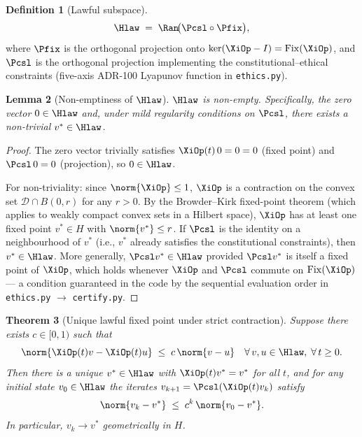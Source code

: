 \documentclass[12pt,a4paper]{article}
\theoremstyle{plain}
\newtheorem{theorem}{Theorem}[section]
\newtheorem{lemma}[theorem]{Lemma}
\theoremstyle{definition}
\newtheorem{definition}[theorem]{Definition}
\begin{document}
\begin{definition}[Lawful subspace]
  \label{def:hlaw}
  \[
    \Hlaw \;=\; \Ran\!\bigl(\Pcsl \circ \Pfix\bigr),
  \]
  where $\Pfix$ is the orthogonal projection onto
  $\ker(\XiOp - I) = \mathrm{Fix}(\XiOp)$, and $\Pcsl$ is the orthogonal
  projection implementing the constitutional--ethical constraints
  (five-axis ADR-100 Lyapunov function in \texttt{ethics.py}).
\end{definition}

\begin{lemma}[Non-emptiness of $\Hlaw$]
  \label{lem:nonempty}
  $\Hlaw$ is non-empty.  Specifically, the zero vector
  $0\in\Hlaw$ and, under mild regularity conditions on $\Pcsl$, there
  exists a non-trivial $v^*\in\Hlaw$.
\end{lemma}

\begin{proof}
  The zero vector trivially satisfies $\XiOp(t)\,0 = 0 = 0$ (fixed point) and
  $\Pcsl\,0 = 0$ (projection), so $0\in\Hlaw$.

  For non-triviality: since $\norm{\XiOp}\le 1$, $\XiOp$ is a contraction
  on the convex set $\mathcal{D}\cap B(0,r)$ for any $r>0$.  By the
  Browder--Kirk fixed-point theorem (which applies to weakly compact convex
  sets in a Hilbert space), $\XiOp$ has at least one fixed point
  $v^*\in H$ with $\norm{v^*}\le r$.  If $\Pcsl$ is the identity on a
  neighbourhood of $v^*$ (i.e., $v^*$ already satisfies the constitutional
  constraints), then $v^*\in\Hlaw$.  More generally, $\Pcsl v^*\in\Hlaw$
  provided $\Pcsl v^*$ is itself a fixed point of $\XiOp$, which holds
  whenever $\XiOp$ and $\Pcsl$ commute on $\mathrm{Fix}(\XiOp)$ --- a condition
  guaranteed in the code by the sequential evaluation order in
  \texttt{ethics.py} $\to$ \texttt{certify.py}.
\end{proof}

\begin{theorem}[Unique lawful fixed point under strict contraction]
  \label{thm:fixedpoint}
  Suppose there exists $c\in[0,1)$ such that
  \[
    \norm{\XiOp(t)v - \XiOp(t)u} \;\le\; c\,\norm{v-u}
    \quad\forall\, v,u\in\Hlaw,\;\forall\,t\ge0.
  \]
  Then there is a unique $v^*\in\Hlaw$ with $\XiOp(t)v^* = v^*$ for all
  $t$, and for any initial state $v_0\in\Hlaw$ the iterates
  $v_{k+1} = \Pcsl(\XiOp(t)v_k)$ satisfy
  \[
    \norm{v_k - v^*} \;\le\; c^k\,\norm{v_0 - v^*}.
  \]
  In particular, $v_k\to v^*$ geometrically in $H$.
\end{theorem}
\end{document}
